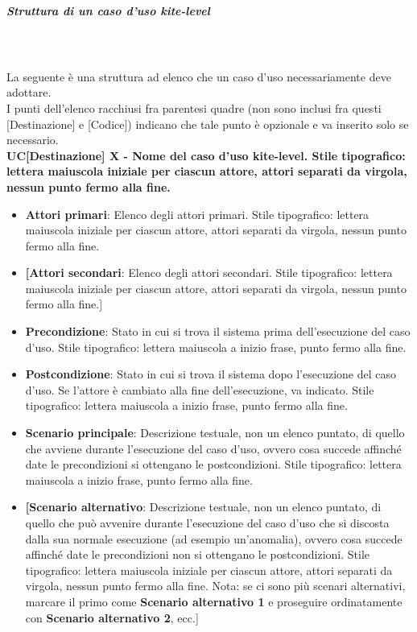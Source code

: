 \subparagraph*{Struttura di un caso d'uso kite-level}\mbox{}\\ \\
La seguente è una struttura ad elenco che un caso d'uso  necessariamente deve adottare.\\
I punti dell'elenco racchiusi fra parentesi quadre (non sono inclusi fra questi [Destinazione] e [Codice]) indicano che tale punto è opzionale e va inserito solo se necessario.\\
\textbf{UC[Destinazione] X - Nome del caso d'uso kite-level. Stile tipografico: lettera maiuscola iniziale per ciascun attore, attori separati da virgola, nessun punto fermo alla fine.} %
\begin{itemize}
	\item \textbf{Attori primari}: Elenco degli attori primari.
	Stile tipografico: lettera maiuscola iniziale per ciascun attore, attori separati da virgola, nessun punto fermo alla fine.
	\item \textbf{[Attori secondari}: Elenco degli attori secondari.
	Stile tipografico: lettera maiuscola iniziale per ciascun attore, attori separati da virgola, nessun punto fermo alla fine.]
	\item \textbf{Precondizione}: Stato in cui si trova il sistema prima dell'esecuzione del caso d'uso.
	Stile tipografico: lettera maiuscola a inizio frase, punto fermo alla fine.
	\item \textbf{Postcondizione}: Stato in cui si trova il sistema dopo l'esecuzione del caso d'uso.
	Se l'attore è cambiato alla fine dell'esecuzione, va indicato.
	Stile tipografico: lettera maiuscola a inizio frase, punto fermo alla fine.
	\item \textbf{Scenario principale}: Descrizione testuale, non un elenco puntato, di quello che avviene durante l'esecuzione del caso d'uso, ovvero cosa succede affinché date le precondizioni si ottengano le postcondizioni.
	Stile tipografico: lettera maiuscola a inizio frase, punto fermo alla fine.
	\item \textbf{[Scenario alternativo}: Descrizione testuale, non un elenco puntato, di quello che può avvenire durante l'esecuzione del caso d'uso che si discosta dalla sua normale esecuzione (ad esempio un'anomalia), ovvero cosa succede affinché date le precondizioni non si ottengano le postcondizioni.
	Stile tipografico: lettera maiuscola iniziale per ciascun attore, attori separati da virgola, nessun punto fermo alla fine.
	Nota: se ci sono più scenari alternativi, marcare il primo come \textbf{Scenario alternativo 1} e proseguire ordinatamente con \textbf{Scenario alternativo 2}, ecc.]

\end{itemize}
